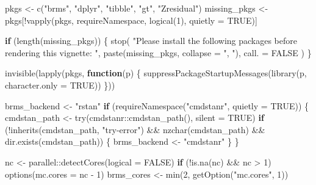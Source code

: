 \documentclass[
  english,
  letterpaper,
  DIV=11,
  numbers=noendperiod]{scrartcl}
\newenvironment{Shaded}{\begin{snugshade}}{\end{snugshade}}
\newcommand{\AttributeTok}[1]{\textcolor[rgb]{0.40,0.45,0.13}{#1}}
\newcommand{\ConstantTok}[1]{\textcolor[rgb]{0.56,0.35,0.01}{#1}}
\newcommand{\ControlFlowTok}[1]{\textcolor[rgb]{0.00,0.23,0.31}{\textbf{#1}}}
\newcommand{\DecValTok}[1]{\textcolor[rgb]{0.68,0.00,0.00}{#1}}
\newcommand{\FunctionTok}[1]{\textcolor[rgb]{0.28,0.35,0.67}{#1}}
\newcommand{\NormalTok}[1]{\textcolor[rgb]{0.00,0.23,0.31}{#1}}
\newcommand{\OtherTok}[1]{\textcolor[rgb]{0.00,0.23,0.31}{#1}}
\newcommand{\SpecialCharTok}[1]{\textcolor[rgb]{0.37,0.37,0.37}{#1}}
\newcommand{\StringTok}[1]{\textcolor[rgb]{0.13,0.47,0.30}{#1}}
\begin{document}
\begin{Shaded}
\begin{Highlighting}[]
\NormalTok{pkgs }\OtherTok{\textless{}{-}} \FunctionTok{c}\NormalTok{(}\StringTok{"brms"}\NormalTok{, }\StringTok{"dplyr"}\NormalTok{, }\StringTok{"tibble"}\NormalTok{, }\StringTok{"gt"}\NormalTok{, }\StringTok{"Zresidual"}\NormalTok{)}
\NormalTok{missing\_pkgs }\OtherTok{\textless{}{-}}\NormalTok{ pkgs[}\SpecialCharTok{!}\FunctionTok{vapply}\NormalTok{(pkgs, requireNamespace, }\FunctionTok{logical}\NormalTok{(}\DecValTok{1}\NormalTok{), }\AttributeTok{quietly =} \ConstantTok{TRUE}\NormalTok{)]}

\ControlFlowTok{if}\NormalTok{ (}\FunctionTok{length}\NormalTok{(missing\_pkgs)) \{}
  \FunctionTok{stop}\NormalTok{(}
    \StringTok{"Please install the following packages before rendering this vignette: "}\NormalTok{,}
    \FunctionTok{paste}\NormalTok{(missing\_pkgs, }\AttributeTok{collapse =} \StringTok{", "}\NormalTok{),}
    \AttributeTok{call. =} \ConstantTok{FALSE}
\NormalTok{  )}
\NormalTok{\}}

\FunctionTok{invisible}\NormalTok{(}\FunctionTok{lapply}\NormalTok{(pkgs, }\ControlFlowTok{function}\NormalTok{(p) \{}
  \FunctionTok{suppressPackageStartupMessages}\NormalTok{(}\FunctionTok{library}\NormalTok{(p, }\AttributeTok{character.only =} \ConstantTok{TRUE}\NormalTok{))}
\NormalTok{\}))}

\NormalTok{brms\_backend }\OtherTok{\textless{}{-}} \StringTok{"rstan"}
\ControlFlowTok{if}\NormalTok{ (}\FunctionTok{requireNamespace}\NormalTok{(}\StringTok{"cmdstanr"}\NormalTok{, }\AttributeTok{quietly =} \ConstantTok{TRUE}\NormalTok{)) \{}
\NormalTok{  cmdstan\_path }\OtherTok{\textless{}{-}} \FunctionTok{try}\NormalTok{(cmdstanr}\SpecialCharTok{::}\FunctionTok{cmdstan\_path}\NormalTok{(), }\AttributeTok{silent =} \ConstantTok{TRUE}\NormalTok{)}
  \ControlFlowTok{if}\NormalTok{ (}\SpecialCharTok{!}\FunctionTok{inherits}\NormalTok{(cmdstan\_path, }\StringTok{"try{-}error"}\NormalTok{) }\SpecialCharTok{\&\&} \FunctionTok{nzchar}\NormalTok{(cmdstan\_path) }\SpecialCharTok{\&\&} \FunctionTok{dir.exists}\NormalTok{(cmdstan\_path)) \{}
\NormalTok{    brms\_backend }\OtherTok{\textless{}{-}} \StringTok{"cmdstanr"}
\NormalTok{  \}}
\NormalTok{\}}

\NormalTok{nc }\OtherTok{\textless{}{-}}\NormalTok{ parallel}\SpecialCharTok{::}\FunctionTok{detectCores}\NormalTok{(}\AttributeTok{logical =} \ConstantTok{FALSE}\NormalTok{)}
\ControlFlowTok{if}\NormalTok{ (}\SpecialCharTok{!}\FunctionTok{is.na}\NormalTok{(nc) }\SpecialCharTok{\&\&}\NormalTok{ nc }\SpecialCharTok{\textgreater{}} \DecValTok{1}\NormalTok{) }\FunctionTok{options}\NormalTok{(}\AttributeTok{mc.cores =}\NormalTok{ nc }\SpecialCharTok{{-}} \DecValTok{1}\NormalTok{)}
\NormalTok{brms\_cores }\OtherTok{\textless{}{-}} \FunctionTok{min}\NormalTok{(}\DecValTok{2}\NormalTok{, }\FunctionTok{getOption}\NormalTok{(}\StringTok{"mc.cores"}\NormalTok{, }\DecValTok{1}\NormalTok{))}
\end{Highlighting}
\end{Shaded}
\end{document}
